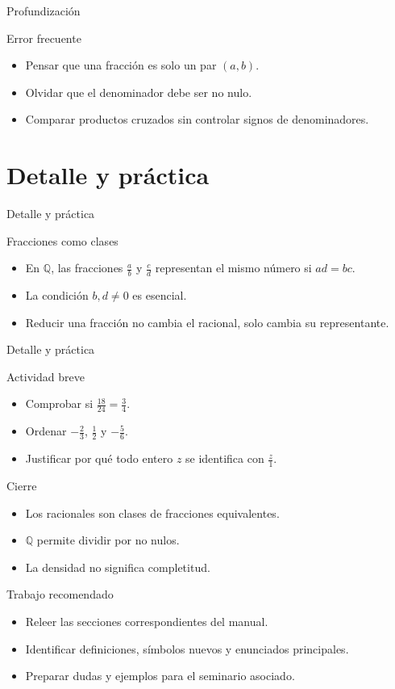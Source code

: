 \documentclass[aspectratio=169,11pt]{beamer}
\begin{document}
\begin{frame}{Profundización}
\begin{block}{Error frecuente}
\begin{itemize}
  \item Pensar que una fracción es solo un par \((a,b)\).
  \item Olvidar que el denominador debe ser no nulo.
  \item Comparar productos cruzados sin controlar signos de denominadores.
\end{itemize}
\end{block}
\end{frame}


\section{Detalle y práctica}

\begin{frame}{Detalle y práctica}
\begin{block}{Fracciones como clases}
\begin{itemize}
  \item En \(\mathbb{Q}\), las fracciones \(\frac{a}{b}\) y \(\frac{c}{d}\) representan el mismo número si \(ad=bc\).
  \item La condición \(b,d\neq 0\) es esencial.
  \item Reducir una fracción no cambia el racional, solo cambia su representante.
\end{itemize}
\end{block}
\end{frame}

\begin{frame}{Detalle y práctica}
\begin{block}{Actividad breve}
\begin{itemize}
  \item Comprobar si \(\frac{18}{24}=\frac{3}{4}\).
  \item Ordenar \(-\frac{2}{3}\), \(\frac{1}{2}\) y \(-\frac{5}{6}\).
  \item Justificar por qué todo entero \(z\) se identifica con \(\frac{z}{1}\).
\end{itemize}
\end{block}
\end{frame}

\begin{frame}{Cierre}
\begin{itemize}
  \item Los racionales son clases de fracciones equivalentes.
  \item \(\mathbb{Q}\) permite dividir por no nulos.
  \item La densidad no significa completitud.
\end{itemize}
\end{frame}

\begin{frame}{Trabajo recomendado}
\begin{itemize}
  \item Releer las secciones correspondientes del manual.
  \item Identificar definiciones, símbolos nuevos y enunciados principales.
  \item Preparar dudas y ejemplos para el seminario asociado.
\end{itemize}
\end{frame}
\end{document}
